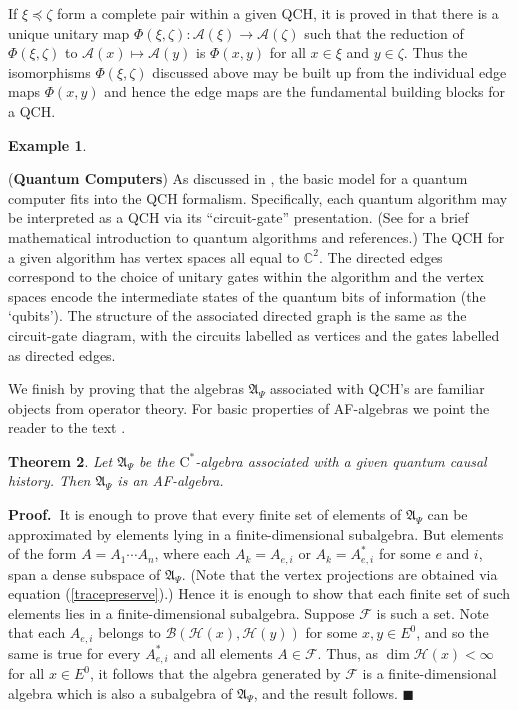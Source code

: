 \documentclass[12pt]{amsart}
\theoremstyle{plain}
\newtheorem{thm}{Theorem}[section]
\theoremstyle{definition}
\newtheorem{eg}[thm]{Example}
\newcommand{\Prf}{\noindent\textbf{Proof.\ }}
\newcommand{\bx}{\hfill$\blacksquare$\medbreak}
\newcommand{\ca}{\mathrm{C}^*}
\newcommand{\bbC}{{\mathbb{C}}}
\newcommand{\A}{{\mathcal{A}}}
\newcommand{\B}{{\mathcal{B}}}
\newcommand{\F}{{\mathcal{F}}}
\renewcommand{\H}{{\mathcal{H}}}
\newcommand{\fA}{{\mathfrak{A}}}
\begin{document}
If $\xi\preceq\zeta$ form a complete pair within a given QCH, it
is proved in \cite{HMS} that there is a unique unitary map
$\Phi(\xi,\zeta):\A(\xi)\rightarrow\A(\zeta)$ such that the
reduction of $\Phi(\xi,\zeta)$ to $\A(x)\mapsto\A(y)$  is
$\Phi(x,y)$ for all $x\in\xi$ and $y\in\zeta$. Thus the
isomorphisms $\Phi(\xi,\zeta)$ discussed above may be built up
from the individual edge maps $\Phi(x,y)$ and hence the edge maps
are the fundamental building blocks for a QCH.

\begin{eg}\label{S:qcomp}

({\bf Quantum Computers}) As discussed in \cite{M00C}, the basic
model for a quantum computer fits into the QCH formalism.
Specifically, each quantum algorithm may be interpreted as a QCH
via its ``circuit-gate'' presentation. (See \cite{Ksurvey} for a
brief mathematical introduction to quantum algorithms and
references.) The QCH for a given algorithm has vertex spaces all
equal to $\bbC^2$. The directed edges correspond to the choice of
unitary gates within the algorithm and the vertex spaces encode
the intermediate states of the quantum bits of information (the
`qubits'). The structure of the associated directed graph is the
same as the circuit-gate diagram, with the circuits labelled as
vertices and the gates labelled as directed edges.
\end{eg}

We finish by proving that the algebras $\fA_\Psi$ associated with
QCH's are familiar objects from operator theory. For basic
properties of AF-algebras we point the reader to the text
\cite{byeg}.

\begin{thm}\label{qchopalg}
Let $\fA_\Psi$ be the $\ca$-algebra associated with a given
quantum causal history. Then $\fA_\Psi$ is an AF-algebra.
\end{thm}

\Prf It is enough to prove that every finite set of elements of
$\fA_\Psi$ can be approximated by elements lying in a
finite-dimensional subalgebra. But elements of the form $A =
A_1\cdots A_n$, where each $A_k=A_{e,i}$ or $A_k = A_{e,i}^*$ for
some $e$ and $i$, span a dense subspace of $\fA_\Psi$. (Note that
the vertex projections are obtained via equation
(\ref{tracepreserve}).) Hence it is enough to show that each
finite set of such elements lies in a finite-dimensional
subalgebra. Suppose $\F$ is such a set. Note that each $A_{e,i}$
belongs to $\B(\H(x),\H(y))$ for some $x,y\in E^0$, and so the
same is true for every $A_{e,i}^*$ and all elements $A\in\F$.
Thus, as $\dim\H(x)<\infty$ for all $x\in E^0$, it follows that
the algebra generated by $\F$ is a finite-dimensional algebra
which is also a subalgebra of $\fA_\Psi$, and the result follows.
\bx
\end{document}
